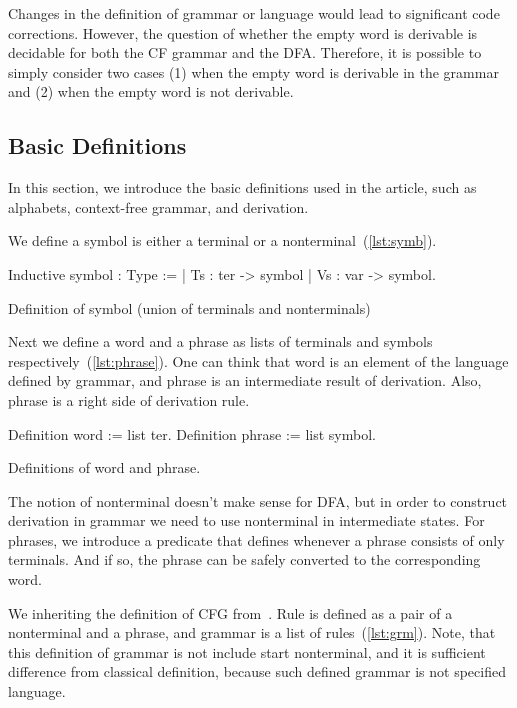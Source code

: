 Changes in the definition of grammar or language would lead to significant code corrections. However, the question of whether the empty word is derivable is decidable for both the CF grammar and the DFA. Therefore, it is possible to simply consider two cases (1) when the empty word is derivable in the grammar and (2) when the empty word is not derivable.

\subsection{Basic Definitions}

In this section, we introduce the basic definitions used in the article, such as alphabets, context-free grammar, and derivation.

We define a symbol is either a terminal or a nonterminal~(\ref{lst:symb}).

\begin{listing}[h]
    \begin{pyglist}[language=coq, numbers=none, numbersep=5pt]
  Inductive symbol : Type :=
    | Ts : ter -> symbol
    | Vs : var -> symbol.
    \end{pyglist}
    \caption{Definition of symbol (union of terminals and nonterminals)}
    \label{lst:symb}
\end{listing}

Next we define a word and a phrase as lists of terminals and symbols respectively~(\ref{lst:phrase}).
One can think that word is an element of the language defined by grammar, and phrase is an intermediate result of derivation.
Also, phrase is a right side of derivation rule.

\begin{listing}[h]
    \begin{pyglist}[language=coq, numbers=none, numbersep=5pt]
  Definition word := list ter.
  Definition phrase := list symbol.
    \end{pyglist}
    \caption{Definitions of word and phrase.}
    \label{lst:phrase}
\end{listing}

The notion of nonterminal doesn't make sense for DFA, but in order to construct derivation in grammar we need to use nonterminal in intermediate states. For phrases, we introduce a predicate that defines whenever a phrase consists of only terminals. And if so, the phrase can be safely converted to the corresponding word.

We inheriting the definition of CFG from~\cite{smolkaHofmann2016}. Rule is defined as a pair of a nonterminal and a phrase, and grammar is a list of rules~(\ref{lst:grm}).
Note, that this definition of grammar is not include start nonterminal, and it is sufficient difference from classical definition, because such defined grammar is not specified language.

